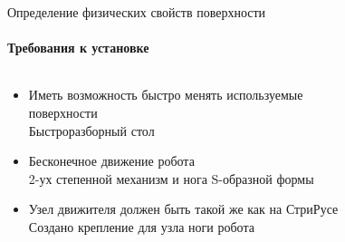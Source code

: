 \documentclass[aspectratio=169,xcolor=table]{beamer}
\begin{document}
\begin{frame}[t]{Определение физических свойств поверхности}
    \framesubtitle{Требования к установке}
    \vspace{-0.5cm}
    \begin{columns}[T,onlytextwidth]
        \begin{column}{0.57\textwidth}
            \begin{itemize}
                \item Иметь возможность быстро менять используемые поверхности {\\ \alert{Быстроразборный стол}}
                \item Бесконечное движение робота {\\ \alert{2-ух степенной механизм и нога S-образной формы}}
                \item Узел движителя должен быть такой же как на СтриРусе {\\ \alert{Создано крепление для узла ноги робота}}
            \end{itemize}
        \end{column}
        \begin{column}{0.42\textwidth}
            \vspace{-0.8cm}
            \begin{figure}[H]
                \centering
\end{figure}
\end{column}
\end{columns}
\end{frame}
\end{document}
